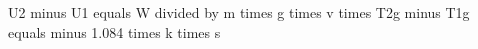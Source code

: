 U2 minus U1 equals W divided by m times g times v times T2g minus T1g equals minus 1.084 times k times s